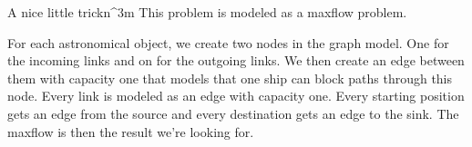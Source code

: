\documentclass{writeup}
\begin{document}
\begin{solutions}
  \begin{solution}{A nice little trick}{n^3}{m}
    This problem is modeled as a maxflow problem.

    For each astronomical object, we create two nodes in the graph model.
    One for the incoming links and on for the outgoing links.
    We then create an edge between them with capacity one that models that one ship can block paths through this node.
    Every link is modeled as an edge with capacity one.
    Every starting position gets an edge from the source and every destination gets an edge to the sink.
    The maxflow is then the result we're looking for.

  \end{solution}
\end{solutions}
\end{document}
